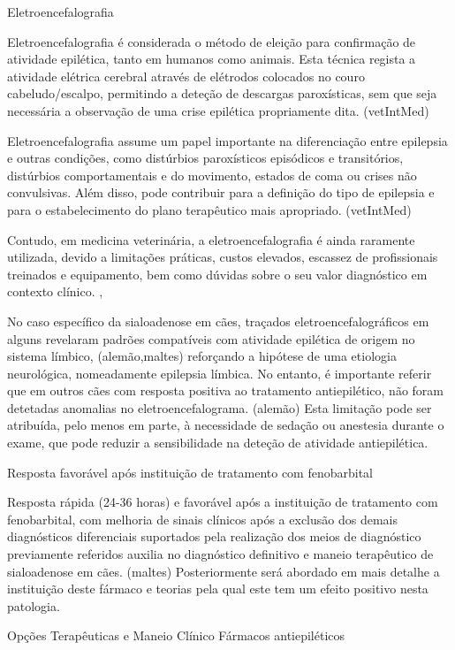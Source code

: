 Eletroencefalografia


Eletroencefalografia é considerada o método de eleição para confirmação de atividade epilética, tanto em humanos como animais. \cite{Everest2024} Esta técnica regista a atividade elétrica cerebral através de elétrodos colocados no couro cabeludo/escalpo, \cite{Everest2024} permitindo a deteção de descargas paroxísticas, sem que seja necessária a observação de uma crise epilética propriamente dita. (vetIntMed)


Eletroencefalografia assume um papel importante na diferenciação entre epilepsia e outras condições, como distúrbios paroxísticos episódicos e transitórios, distúrbios comportamentais e do movimento, estados de coma ou crises não convulsivas. \cite{Luca2023} Além disso, pode contribuir para a definição do tipo de epilepsia e para o estabelecimento do plano terapêutico mais apropriado. (vetIntMed)


Contudo, em medicina veterinária, a eletroencefalografia é ainda raramente utilizada, devido a limitações práticas, custos elevados, escassez de profissionais treinados e equipamento, bem como dúvidas sobre o seu valor diagnóstico em contexto clínico. \cite{Everest2024},\cite{Luca2023}


No caso específico da sialoadenose em cães, traçados eletroencefalográficos em alguns revelaram padrões compatíveis com atividade epilética de origem no sistema límbico, (alemão,maltes) reforçando a hipótese de uma etiologia neurológica, nomeadamente epilepsia límbica. No entanto, é importante referir que em outros cães com resposta positiva ao tratamento antiepilético, não foram detetadas anomalias no eletroencefalograma. (alemão) Esta limitação pode ser atribuída, pelo menos em parte, à necessidade de sedação ou anestesia durante o exame, que pode reduzir a sensibilidade na deteção de atividade antiepilética. \cite{Loscher2022}

Resposta favorável após instituição de tratamento com fenobarbital

Resposta rápida (24-36 horas) e favorável após a instituição de tratamento com fenobarbital, com melhoria de sinais clínicos após a exclusão dos demais diagnósticos diferenciais suportados pela realização dos meios de diagnóstico previamente referidos auxilia no diagnóstico definitivo e maneio terapêutico de sialoadenose em cães. (maltes) Posteriormente será abordado em mais detalhe a instituição deste fármaco e teorias pela qual este tem um efeito positivo nesta patologia. 

Opções Terapêuticas e Maneio Clínico 
Fármacos antiepiléticos


